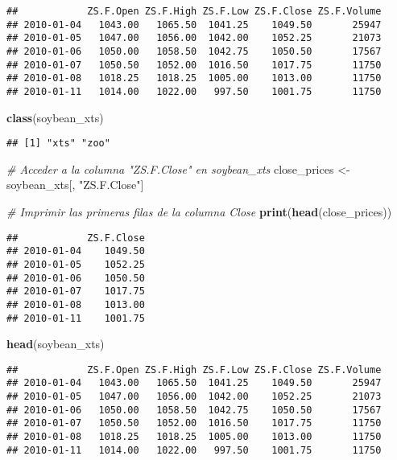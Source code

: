 \documentclass[
]{book}
\newenvironment{Shaded}{\begin{snugshade}}{\end{snugshade}}
\newcommand{\CommentTok}[1]{\textcolor[rgb]{0.56,0.35,0.01}{\textit{#1}}}
\newcommand{\FunctionTok}[1]{\textcolor[rgb]{0.13,0.29,0.53}{\textbf{#1}}}
\newcommand{\NormalTok}[1]{#1}
\newcommand{\OtherTok}[1]{\textcolor[rgb]{0.56,0.35,0.01}{#1}}
\newcommand{\StringTok}[1]{\textcolor[rgb]{0.31,0.60,0.02}{#1}}
\begin{document}
\begin{verbatim}
##            ZS.F.Open ZS.F.High ZS.F.Low ZS.F.Close ZS.F.Volume
## 2010-01-04   1043.00   1065.50  1041.25    1049.50       25947
## 2010-01-05   1047.00   1056.00  1042.00    1052.25       21073
## 2010-01-06   1050.00   1058.50  1042.75    1050.50       17567
## 2010-01-07   1050.50   1052.00  1016.50    1017.75       11750
## 2010-01-08   1018.25   1018.25  1005.00    1013.00       11750
## 2010-01-11   1014.00   1022.00   997.50    1001.75       11750
\end{verbatim}

\begin{Shaded}
\begin{Highlighting}[]
\FunctionTok{class}\NormalTok{(soybean\_xts)}
\end{Highlighting}
\end{Shaded}

\begin{verbatim}
## [1] "xts" "zoo"
\end{verbatim}

\begin{Shaded}
\begin{Highlighting}[]
\CommentTok{\# Acceder a la columna "ZS.F.Close" en soybean\_xts}
\NormalTok{close\_prices }\OtherTok{\textless{}{-}}\NormalTok{ soybean\_xts[, }\StringTok{"ZS.F.Close"}\NormalTok{]}

\CommentTok{\# Imprimir las primeras filas de la columna Close}
\FunctionTok{print}\NormalTok{(}\FunctionTok{head}\NormalTok{(close\_prices))}
\end{Highlighting}
\end{Shaded}

\begin{verbatim}
##            ZS.F.Close
## 2010-01-04    1049.50
## 2010-01-05    1052.25
## 2010-01-06    1050.50
## 2010-01-07    1017.75
## 2010-01-08    1013.00
## 2010-01-11    1001.75
\end{verbatim}

\begin{Shaded}
\begin{Highlighting}[]
\FunctionTok{head}\NormalTok{(soybean\_xts)}
\end{Highlighting}
\end{Shaded}

\begin{verbatim}
##            ZS.F.Open ZS.F.High ZS.F.Low ZS.F.Close ZS.F.Volume
## 2010-01-04   1043.00   1065.50  1041.25    1049.50       25947
## 2010-01-05   1047.00   1056.00  1042.00    1052.25       21073
## 2010-01-06   1050.00   1058.50  1042.75    1050.50       17567
## 2010-01-07   1050.50   1052.00  1016.50    1017.75       11750
## 2010-01-08   1018.25   1018.25  1005.00    1013.00       11750
## 2010-01-11   1014.00   1022.00   997.50    1001.75       11750
\end{verbatim}
\end{document}
